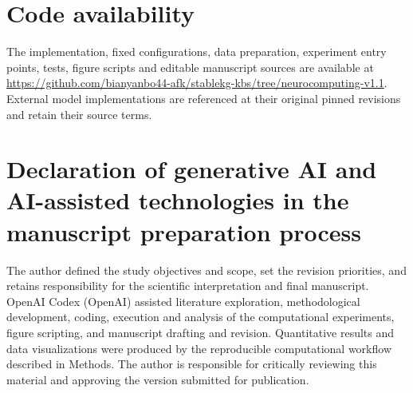 \documentclass[5p,twocolumn]{elsarticle}
\begin{document}
\section*{Code availability}
The implementation, fixed configurations, data preparation, experiment entry points, tests, figure scripts and editable manuscript sources are available at \url{https://github.com/bianyanbo44-afk/stablekg-kbs/tree/neurocomputing-v1.1}. External model implementations are referenced at their original pinned revisions and retain their source terms.
\section*{Declaration of generative AI and AI-assisted technologies in the manuscript preparation process}
The author defined the study objectives and scope, set the revision priorities, and retains responsibility for the scientific interpretation and final manuscript. OpenAI Codex (OpenAI) assisted literature exploration, methodological development, coding, execution and analysis of the computational experiments, figure scripting, and manuscript drafting and revision. Quantitative results and data visualizations were produced by the reproducible computational workflow described in Methods. The author is responsible for critically reviewing this material and approving the version submitted for publication.

\setlength{\bibsep}{0pt}

\end{document}
